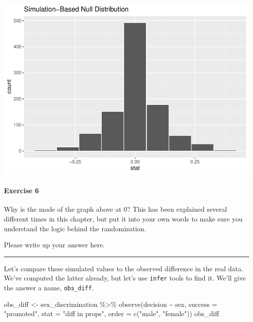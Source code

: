 \documentclass[
]{book}
\newenvironment{Shaded}{\begin{snugshade}}{\end{snugshade}}
\newcommand{\AttributeTok}[1]{\textcolor[rgb]{0.77,0.63,0.00}{#1}}
\newcommand{\FunctionTok}[1]{\textcolor[rgb]{0.00,0.00,0.00}{#1}}
\newcommand{\NormalTok}[1]{#1}
\newcommand{\OtherTok}[1]{\textcolor[rgb]{0.56,0.35,0.01}{#1}}
\newcommand{\SpecialCharTok}[1]{\textcolor[rgb]{0.00,0.00,0.00}{#1}}
\newcommand{\StringTok}[1]{\textcolor[rgb]{0.31,0.60,0.02}{#1}}
\begin{document}
\includegraphics{intro_stats_files/figure-latex/unnamed-chunk-255-1.pdf}

\hypertarget{exercise-6-3}{%
\paragraph*{Exercise 6}\label{exercise-6-3}}

Why is the mode of the graph above at 0? This has been explained several different times in this chapter, but put it into your own words to make sure you understand the logic behind the randomization.

Please write up your answer here.

\begin{center}\rule{0.5\linewidth}{0.5pt}\end{center}

Let's compare these simulated values to the observed difference in the real data. We've computed the latter already, but let's use \texttt{infer} tools to find it. We'll give the answer a name, \texttt{obs\_diff}.

\begin{Shaded}
\begin{Highlighting}[]
\NormalTok{obs\_diff }\OtherTok{\textless{}{-}}\NormalTok{ sex\_discrimination }\SpecialCharTok{\%\textgreater{}\%}
    \FunctionTok{observe}\NormalTok{(decision }\SpecialCharTok{\textasciitilde{}}\NormalTok{ sex, }\AttributeTok{success =} \StringTok{"promoted"}\NormalTok{,}
            \AttributeTok{stat =} \StringTok{"diff in props"}\NormalTok{, }\AttributeTok{order =} \FunctionTok{c}\NormalTok{(}\StringTok{"male"}\NormalTok{, }\StringTok{"female"}\NormalTok{))}
\NormalTok{obs\_diff}
\end{Highlighting}
\end{Shaded}
\end{document}

